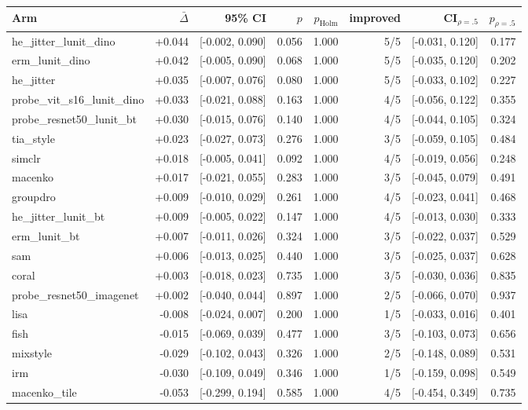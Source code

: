 \begin{tabular}{lrrrrrrr}
\toprule
Arm & $\bar\Delta$ & 95\% CI & $p$ & $p_\text{Holm}$ & improved & CI$_{\rho=.5}$ & $p_{\rho=.5}$ \\
\midrule
he\_jitter\_lunit\_dino & +0.044 & [-0.002, 0.090] & 0.056 & 1.000 & 5/5 & [-0.031, 0.120] & 0.177 \\
erm\_lunit\_dino & +0.042 & [-0.005, 0.090] & 0.068 & 1.000 & 5/5 & [-0.035, 0.120] & 0.202 \\
he\_jitter & +0.035 & [-0.007, 0.076] & 0.080 & 1.000 & 5/5 & [-0.033, 0.102] & 0.227 \\
probe\_vit\_s16\_lunit\_dino & +0.033 & [-0.021, 0.088] & 0.163 & 1.000 & 4/5 & [-0.056, 0.122] & 0.355 \\
probe\_resnet50\_lunit\_bt & +0.030 & [-0.015, 0.076] & 0.140 & 1.000 & 4/5 & [-0.044, 0.105] & 0.324 \\
tia\_style & +0.023 & [-0.027, 0.073] & 0.276 & 1.000 & 3/5 & [-0.059, 0.105] & 0.484 \\
simclr & +0.018 & [-0.005, 0.041] & 0.092 & 1.000 & 4/5 & [-0.019, 0.056] & 0.248 \\
macenko & +0.017 & [-0.021, 0.055] & 0.283 & 1.000 & 3/5 & [-0.045, 0.079] & 0.491 \\
groupdro & +0.009 & [-0.010, 0.029] & 0.261 & 1.000 & 4/5 & [-0.023, 0.041] & 0.468 \\
he\_jitter\_lunit\_bt & +0.009 & [-0.005, 0.022] & 0.147 & 1.000 & 4/5 & [-0.013, 0.030] & 0.333 \\
erm\_lunit\_bt & +0.007 & [-0.011, 0.026] & 0.324 & 1.000 & 3/5 & [-0.022, 0.037] & 0.529 \\
sam & +0.006 & [-0.013, 0.025] & 0.440 & 1.000 & 3/5 & [-0.025, 0.037] & 0.628 \\
coral & +0.003 & [-0.018, 0.023] & 0.735 & 1.000 & 3/5 & [-0.030, 0.036] & 0.835 \\
probe\_resnet50\_imagenet & +0.002 & [-0.040, 0.044] & 0.897 & 1.000 & 2/5 & [-0.066, 0.070] & 0.937 \\
lisa & -0.008 & [-0.024, 0.007] & 0.200 & 1.000 & 1/5 & [-0.033, 0.016] & 0.401 \\
fish & -0.015 & [-0.069, 0.039] & 0.477 & 1.000 & 3/5 & [-0.103, 0.073] & 0.656 \\
mixstyle & -0.029 & [-0.102, 0.043] & 0.326 & 1.000 & 2/5 & [-0.148, 0.089] & 0.531 \\
irm & -0.030 & [-0.109, 0.049] & 0.346 & 1.000 & 1/5 & [-0.159, 0.098] & 0.549 \\
macenko\_tile & -0.053 & [-0.299, 0.194] & 0.585 & 1.000 & 4/5 & [-0.454, 0.349] & 0.735 \\
\bottomrule
\end{tabular}
